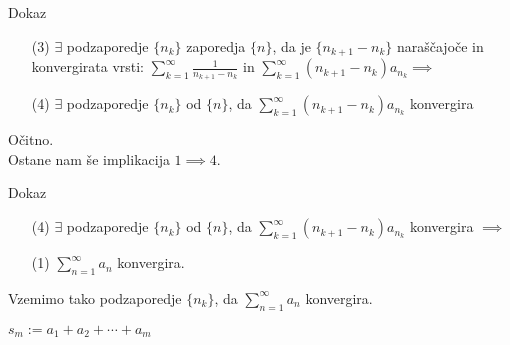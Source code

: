 \documentclass{beamer}
\begin{document}
\begin{frame}{Dokaz}
    \begin{block}{}
        \begin{enumerate} 
            \item[(3)] $\exists$ podzaporedje $\{n_k\}$ zaporedja $\{n\}$, da je $\{n_{k+1} - n_k\}$ 
            naraščajoče in konvergirata vrsti:
            $\sum_{k = 1}^{\infty}{\frac{1}{n_{k+1} - n_k}}$ in 
            $\sum_{k = 1}^{\infty}{(n_{k+1} - n_k)a_{n_k}} \implies$
            \item[(4)] $\exists$ podzaporedje $\{n_k\}$ od $\{n\}$, da 
            $\sum_{k = 1}^{\infty}{(n_{k+1} - n_k)a_{n_k}}$ konvergira

        \end{enumerate}
    \end{block} 
    
    \vspace{0.3cm}
    \pause
    
    Očitno.\\
    Ostane nam še implikacija $ 1 \implies 4$.
    
\end{frame}


\begin{frame}{Dokaz}
    \begin{block}{}
        \begin{enumerate}  
            \item[(4)] $\exists$ podzaporedje $\{n_k\}$ od $\{n\}$, da 
            $\sum_{k = 1}^{\infty}{(n_{k+1} - n_k)a_{n_k}}$ konvergira $\implies$
            \item[(1)] $\sum_{n = 1}^{\infty}{a_n}$ konvergira.
        \end{enumerate}
    \end{block} 
    \pause
    
    Vzemimo tako podzaporedje  $\{n_k\}$, da $\sum_{n = 1}^{\infty}{a_n}$ konvergira.
    \vspace{0.2cm}

    $s_m := a_1 + a_2 + \cdots + a_m$


\end{frame}
\end{document}

